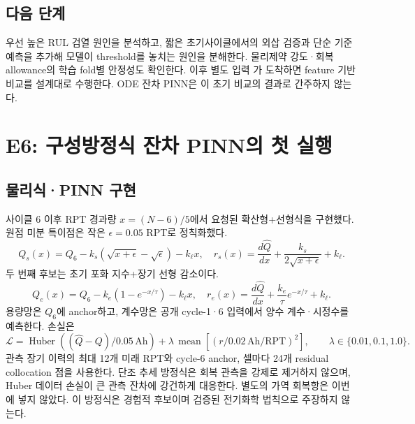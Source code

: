 \subsection*{다음 단계}
우선 높은 RUL 검열 원인을 분석하고, 짧은 초기사이클에서의 외삽 검증과 단순 기준 예측을 추가해 모델이 threshold를 놓치는 원인을 분해한다. 물리제약 강도·회복 allowance의 학습 fold별 안정성도 확인한다. 이후 별도 입력 가 도착하면 feature 기반 비교를 설계대로 수행한다. ODE 잔차 PINN은 이 초기 비교의 결과로 간주하지 않는다.

\clearpage
\section{E6: 구성방정식 잔차 PINN의 첫 실행}

\subsection*{물리식·PINN 구현}
사이클 6 이후 RPT 경과량 $x=(N-6)/5$에서 요청된 확산형+선형식을 구현했다. 원점 미분 특이점은 작은 $\epsilon=0.05$ RPT로 정칙화했다.
\[
Q_s(x)=Q_6-k_s(\sqrt{x+\epsilon}-\sqrt{\epsilon})-k_\ell x,\quad
r_s(x)=\frac{d\hat Q}{dx}+\frac{k_s}{2\sqrt{x+\epsilon}}+k_\ell.
\]
두 번째 후보는 초기 포화 지수+장기 선형 감소이다.
\[
Q_e(x)=Q_6-k_e(1-e^{-x/\tau})-k_\ell x,\quad
r_e(x)=\frac{d\hat Q}{dx}+\frac{k_e}{\tau}e^{-x/\tau}+k_\ell.
\]
용량망은 $Q_6$에 anchor하고, 계수망은 공개 cycle-1·6 입력에서 양수 계수·시정수를 예측한다. 손실은
\[
\mathcal L=\operatorname{Huber}\left((\hat Q-Q)/0.05\,\mathrm{Ah}\right)
+\lambda\,\operatorname{mean}\left[(r/0.02\,\mathrm{Ah/RPT})^2\right],
\qquad \lambda\in\{0.01,0.1,1.0\}.
\]
관측 장기 이력의 최대 12개 미래 RPT와 cycle-6 anchor, 셀마다 24개 residual collocation 점을 사용한다. 단조 추세 방정식은 회복 관측을 강제로 제거하지 않으며, Huber 데이터 손실이 큰 관측 잔차에 강건하게 대응한다. 별도의 가역 회복항은 이번에 넣지 않았다. 이 방정식은 경험적 후보이며 검증된 전기화학 법칙으로 주장하지 않는다.

